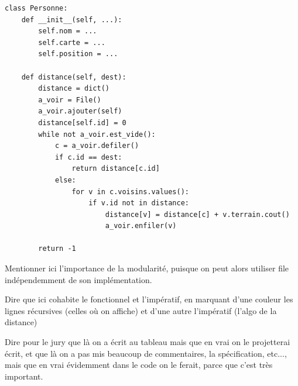 \begin{lstlisting}
class Personne:
    def __init__(self, ...):
        self.nom = ...
        self.carte = ...
        self.position = ...
    
    def distance(self, dest):
        distance = dict()
        a_voir = File()
        a_voir.ajouter(self)
        distance[self.id] = 0
        while not a_voir.est_vide():
            c = a_voir.defiler()
            if c.id == dest:
                return distance[c.id]
            else:
                for v in c.voisins.values():
                    if v.id not in distance:
                        distance[v] = distance[c] + v.terrain.cout()
                        a_voir.enfiler(v)
        
        return -1
\end{lstlisting}

\begin{com}
	Mentionner ici l'importance de la modularité, puisque on peut alors utiliser file indépendemment de son implémentation.
\end{com}

\begin{com}
	Dire que ici cohabite le fonctionnel et l'impératif, en marquant d'une couleur les lignes récursives (celles où on affiche) et d'une autre l'impératif (l'algo de la distance)
\end{com}

\begin{com}
	Dire pour le jury que là on a écrit au tableau mais que en vrai on le projetterai écrit, et que là on a pas mis beaucoup de commentaires, la spécification, etc..., mais que en vrai évidemment dans le code on le ferait, parce que c'est très important.
\end{com}